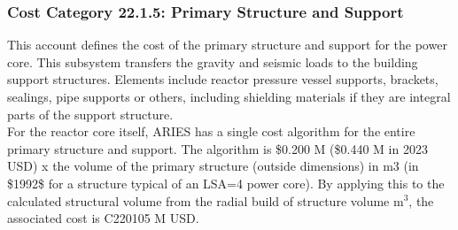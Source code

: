 \subsubsection*{Cost Category 22.1.5:  Primary Structure and Support}
\label{sec:22.1.5}
This account defines the cost of the primary structure and support for the power core. This subsystem  transfers the gravity and seismic loads to the building support structures. Elements include reactor pressure vessel supports, brackets, sealings, pipe supports or others, including shielding materials if they are integral parts of the support structure. \\

For the reactor core itself, ARIES has a single cost algorithm for the entire primary structure and support. The  algorithm is \$0.200 M (\$0.440 M in 2023 USD) x the  volume of the primary structure (outside dimensions) in m3 (in \$1992\$ for a structure typical of  an LSA=4 power core). By applying this to the calculated structural volume from the radial build of structure volume m$^{3}$, the associated cost is C220105 M USD.